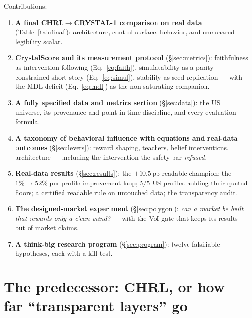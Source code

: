 \documentclass[11pt]{article}
\begin{document}
Contributions:
\begin{enumerate}
  \item \textbf{A final CHRL${\to}$CRYSTAL-1 comparison on real data}
        (Table~\ref{tab:final}): architecture, control surface, behavior, and one shared
        legibility scalar.
  \item \textbf{CrystalScore and its measurement protocol} (\S\ref{sec:metrics}): faithfulness
        as intervention-following (Eq.~\ref{eq:faith}), simulatability as a parity-constrained
        short story (Eq.~\ref{eq:simul}), stability as seed replication --- with the MDL deficit
        (Eq.~\ref{eq:mdl}) as the non-saturating companion.
  \item \textbf{A fully specified data and metrics section} (\S\ref{sec:data}): the US
        universe, its provenance and point-in-time discipline, and every evaluation formula.
  \item \textbf{A taxonomy of behavioral influence with equations and real-data outcomes}
        (\S\ref{sec:levers}): reward shaping, teachers, belief interventions, architecture ---
        including the intervention the safety bar \emph{refused}.
  \item \textbf{Real-data results} (\S\ref{sec:results}): the $+10.5$\,pp readable champion;
        the $1\%\to52\%$ per-profile improvement loop; $5/5$ US profiles holding their quoted
        floors; a certified readable rule on untouched data; the transparency audit.
  \item \textbf{The designed-market experiment} (\S\ref{sec:polygon}): \emph{can a market be
        built that rewards only a clean mind?} --- with the VoI gate that keeps its results out
        of market claims.
  \item \textbf{A think-big research program} (\S\ref{sec:program}): twelve falsifiable
        hypotheses, each with a kill test.
\end{enumerate}

\section{The predecessor: CHRL, or how far ``transparent layers'' go}
\label{sec:chrl}
\end{document}
